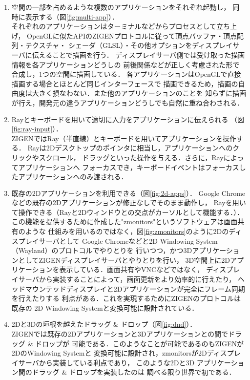 \begin{enumerate}
  \item 空間の一部を占めるような複数のアプリケーションをそれぞれ起動し，
        同時に表示する（図\ref{fig:multi-app}）．\\
        それぞれのアプリケーションはターミナルなどからプロセスとして立ち上げ，
        OpenGLに似たAPIのZIGENプロトコルに従って頂点バッファ・頂点配列・テクスチャ・
        シェーダ（GLSL）・その他オプションをディスプレイサーバに伝えることで描画を行う．
        ディスプレイサーバ側では受け取った描画情報を各アプリケーションどうしの
        前後関係などが正しく考慮された形で合成し，1つの空間に描画している．
        各アプリケーションはOpenGLで直接描画する場合とほとんど同じインターフェースで
        描画できるため，描画の自由度は大きく損なわない．また他のアプリケーションのことを
        知らずに描画が行え，開発元の違うアプリケーションどうしでも自然に重ね合わされる．
  \item Rayとキーボードを用いて適切に入力をアプリケーションに伝えられる
        （図\ref{fig:ray-input}）． \\
        ZIGENではRay（半直線）とキーボードを用いてアプリケーションを操作する．
        Rayは2Dデスクトップのポインタに相当し，アプリケーションへのクリックやスクロール，
        ドラッグといった操作を与える．さらに，Rayによってアプリケーションへ
        フォーカスでき，キーボードイベントはフォーカスしたアプリケーションへのみ渡される．
  \item 既存の2Dアプリケーションを利用できる（図\ref{fig:2d-apps}）．
        Google Chromeなどの既存の2Dアプリケーションが修正なしでそのまま動作し，
        Rayを用いて操作できる（Rayと2Dウィンドウとの交点がカーソルとして機能する．）．
        この機能を提供するために作成した"zmonitors"というソフトウェアは画面共有のような
        仕組みを用いるのではなく，図\ref{fig:zmonitors}のように2Dのディスプレイサーバとして
        Google Chromeなどと2D Windowing System（Wayland）のプロトコルでやりとりを
        行いつつ，かつ3DアプリケーションとしてZIGENディスプレイサーバとやりとりを行い，
        3D空間上に2Dアプリケーションを表示している．画面共有やVNCなどではなく，
        ディスプレイサーバから実装することによって，画面更新をより効率的に行えたり，
        ヘッドマウンテッドディスプレイと2Dアプリケーションが完全にフレーム同期を行えたりする
        利点がある．これを実現するためにZIGENのプロトコルは既存の
        2D Windowing Systemと変換可能に設計されている．
  \item 2Dと3Dの垣根を越えたドラッグ \& ドロップ（図\ref{fig:dnd}）． \\
        ZIGENでは既存の2Dアプリケーションと3Dアプリケーションとの間でドラッグ \& ドロップが
        可能である．このようなことが可能であるのもZIGENが2DのWindowing Systemと
        変換可能に設計され，zmonitorsが2Dディスプレイサーバから実装している利点であり，
        このような2Dと3D アプリケーション間のドラッグ \& ドロップを実装したのは
        調べる限り世界で初である．
\end{enumerate}

